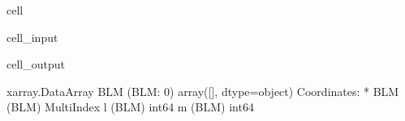 \documentclass[letterpaper,table,10pt,english]{jupyterBook}
\begin{document}
\begin{sphinxuseclass}{cell}\begin{sphinxVerbatimInput}

\begin{sphinxuseclass}{cell_input}
\begin{sphinxVerbatim}[commandchars=\\\{\}]
 
\end{sphinxVerbatim}

\end{sphinxuseclass}\end{sphinxVerbatimInput}
\begin{sphinxVerbatimOutput}

\begin{sphinxuseclass}{cell_output}
\begin{sphinxVerbatim}[commandchars=\\\{\}]
\PYGZlt{}xarray.DataArray \PYGZsq{}BLM\PYGZsq{} (BLM: 0)\PYGZgt{}
array([], dtype=object)
Coordinates:
  * BLM      (BLM) MultiIndex
  \PYGZhy{} l        (BLM) int64 
  \PYGZhy{} m        (BLM) int64 
\end{sphinxVerbatim}

\end{sphinxuseclass}\end{sphinxVerbatimOutput}

\end{sphinxuseclass}
\end{document}
